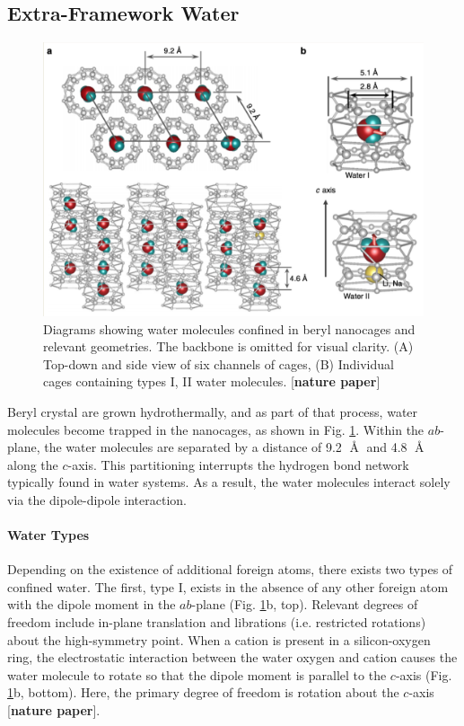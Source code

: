         \subsection{Extra-Framework Water}
        
        \begin{figure}
            \centering
            \includegraphics[width=0.9\linewidth]{Figures/System/beryl_water.png}
            \caption{Diagrams showing water molecules confined in beryl nanocages and relevant geometries. The backbone is omitted for visual clarity. (A) Top-down and side view of six channels of cages, (B) Individual cages containing types I, II water molecules. [\textbf{nature paper}]}
            \label{fig:beryl_water}
        \end{figure}
        
        Beryl crystal are grown hydrothermally, and as part of that process, water molecules become trapped in the nanocages, as shown in Fig. \ref{fig:beryl_water}. Within the $ab$-plane, the water molecules are separated by a distance of 9.2 $\Angstrom$ and 4.8 $\Angstrom$ along the $c$-axis. This partitioning interrupts the hydrogen bond network typically found in water systems. As a result, the water molecules interact solely via the dipole-dipole interaction. 
        
        \paragraph{Water Types} Depending on the existence of additional foreign atoms, there exists two types of confined water. The first, type I, exists in the absence of any other foreign atom with the dipole moment in the $ab$-plane (Fig. \ref{fig:beryl_water}b, top). Relevant degrees of freedom include in-plane translation and librations (i.e. restricted rotations) about the high-symmetry point. When a cation is present in a silicon-oxygen ring, the electrostatic interaction between the water oxygen and cation causes the water molecule to rotate so that the dipole moment is parallel to the $c$-axis (Fig. \ref{fig:beryl_water}b, bottom). Here, the primary degree of freedom is rotation about the $c$-axis [\textbf{nature paper}]. 
        
